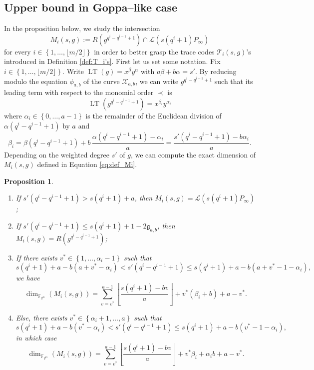 \documentclass[a4paper]{article}
\newtheorem{proposition}[thm]{Proposition}
\theoremstyle{definition}
\theoremstyle{remark}
\newcommand{\calL}{\mathcal{L}}
\newcommand{\calT}{\mathcal{T}}
\newcommand{\calX}{\mathcal{X}}
\newcommand{\fqm}{\mathbb{F}_{q^m}}
\newcommand{\set}[1]{\left\{#1\right\}}
\newcommand{\LT}[1]{\operatorname{LT}\left(#1\right)}
\begin{document}
\subsection{Upper bound in Goppa--like case}
In the proposition below, we study the intersection 
\begin{equation}\label{eq:def_Mi}
M_i(s,g):=R\left(g^{q^{i}-q^{i-1}+1}\right) \cap \calL(s(q^i+1)P_\infty)
\end{equation}
for every $i \in \set{1,\dots,\lfloor m/2 \rfloor}$ in order to better grasp the trace codes $\calT_i(s,g)$'s introduced in Definition \ref{def:T_i's}.
First let us set some notation. Fix $i \in \set{1,\dots,\lfloor m/2 \rfloor}$. Write $\LT{g}=x^\beta y^\alpha$ with $a\beta + b\alpha=s'$. By reducing modulo the equation $\phi_{a,b}$ of the curve $\calX_{a,b}$, we can write $g^{q^i-q^{i-1}+1}$ such that its leading term with respect to the monomial order $\prec$ is
\begin{equation}\label{eq:gi}
 \LT{g^{q^i-q^{i-1}+1}}=x^{\beta_i} y^{\alpha_i}
\end{equation}
 where $\alpha_i \in \set{0,\dots,a-1}$ is the remainder of the Euclidean division of $\alpha (q^i-q^{i-1}+1)$ by $a$ and 
 \begin{equation}\label{eq:value_beta_prime}
  \beta_i=\beta(q^i-q^{i-1}+1) + b \, \frac{\alpha(q^i-q^{i-1}+1)-\alpha_i}{a}= \frac{s'(q^i-q^{i-1}+1)-b\alpha_i}{a}.
 \end{equation}
%
Depending on the weighted degree $s'$ of $g$, we can compute the exact dimension of $M_i(s,g)$ defined in Equation \eqref{eq:def_Mi}.
\begin{proposition} \label{prop:dim_M_i's}
    \begin{enumerate}
        \item If $s'(q^i-q^{i-1}+1) > s(q^i+1)+a$, then $M_i(s,g) = \calL(s(q^i+1)P_\infty)$ ;
        
        \item If $s'(q^i-q^{i-1}+1) \leq s(q^i+1)+1-2\mathfrak{g}_{a,b}$, then $M_i(s,g) = R(g^{q^{i}-q^{i-1}+1})$;
        
        \item If there exists $v^* \in \set{1,\dots,\alpha_i-1}$ such that
        $$ s(q^i+1)+a-b(a+v^*-\alpha_i) < s'(q^i-q^{i-1}+1) \leq  s(q^i+1)+a-b(a+v^*-1-\alpha_i),$$
        we have 
          $$\dim_{\fqm}(M_i(s,g)) = \sum\limits_{v=v^*}^{a-1} \left\lfloor \dfrac{s(q^i+1)-bv}{a} \right\rfloor + v^*(\beta_i+b) + a-v^*.$$
        
        \item Else, there exists $v^* \in \set{\alpha_i+1,\dots,a}$ such that
        $$ s(q^i+1)+a-b(v^*-\alpha_i) < s'(q^i-q^{i-1}+1) \leq  s(q^i+1)+a-b(v^*-1-\alpha_i),$$
        in which case 
        $$\dim_{\fqm}(M_i(s,g)) = \sum\limits_{v=v^*}^{a-1} \left\lfloor \dfrac{s(q^i+1)-bv}{a} \right\rfloor + v^*\beta_i + \alpha_ib +a-v^*.$$
    \end{enumerate}
\end{proposition}
\end{document}

